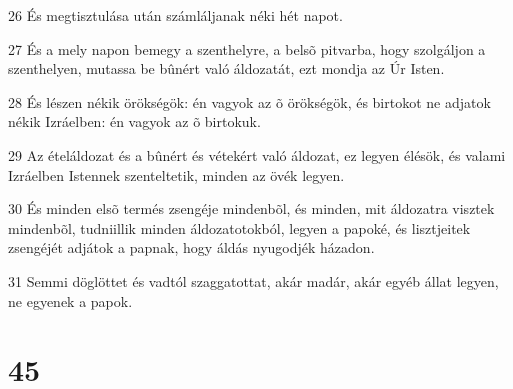 \par 26 És megtisztulása után számláljanak néki hét napot.
\par 27 És a mely napon bemegy a szenthelyre, a belsõ pitvarba, hogy szolgáljon a szenthelyen, mutassa be bûnért való áldozatát, ezt mondja az Úr Isten.
\par 28 És lészen nékik örökségök: én vagyok az õ örökségök, és birtokot ne adjatok nékik Izráelben: én vagyok az õ birtokuk.
\par 29 Az ételáldozat és a bûnért és vétekért való áldozat, ez legyen élésök, és valami Izráelben Istennek szenteltetik, minden az övék legyen.
\par 30 És minden elsõ termés zsengéje mindenbõl, és minden, mit áldozatra visztek mindenbõl, tudniillik minden áldozatotokból, legyen a papoké, és lisztjeitek zsengéjét adjátok a papnak, hogy áldás nyugodjék házadon.
\par 31 Semmi döglöttet és vadtól szaggatottat, akár madár, akár egyéb állat legyen, ne egyenek a papok.

\chapter{45}

